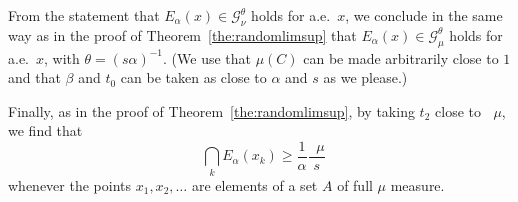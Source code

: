 \documentclass[AHL,Unicode,longabstracts]{cedram}
\DeclareMathOperator{\dimh}{dim_H}
\DeclareMathOperator{\udimh}{\overline{dim}_H}
\newcommand*{\dimh}{\mathrm{dim}_{\mathrm{H}}}
\begin{document}
From the statement that $E_\alpha (x) \in \mathscr{G}_\nu^\theta$ holds for a.e.\ $x$, we conclude in the same way as in the proof of Theorem~\ref{the:randomlimsup} that $E_\alpha (x) \in
\mathscr{G}_\mu^\theta$ holds for a.e.\ $x$, with $\theta = (s
\alpha)^{-1}$. (We use that $\mu(C)$ can be made arbitrarily close to
$1$ and that $\beta$ and $t_0$ can be taken as  close to $\alpha$ and $s$ as we please.)

Finally, as in the proof of Theorem~\ref{the:randomlimsup}, by taking $t_2$ close to $\udimh \mu$, we find that
\[
\dimh \bigcap_k E_\alpha (x_k) \geq \frac{1}{\alpha} \frac{\udimh
\mu}{s}
\]
whenever the points $x_1, x_2, \ldots$ are elements of a set $A$ of full $\mu$ measure.


\end{document}
